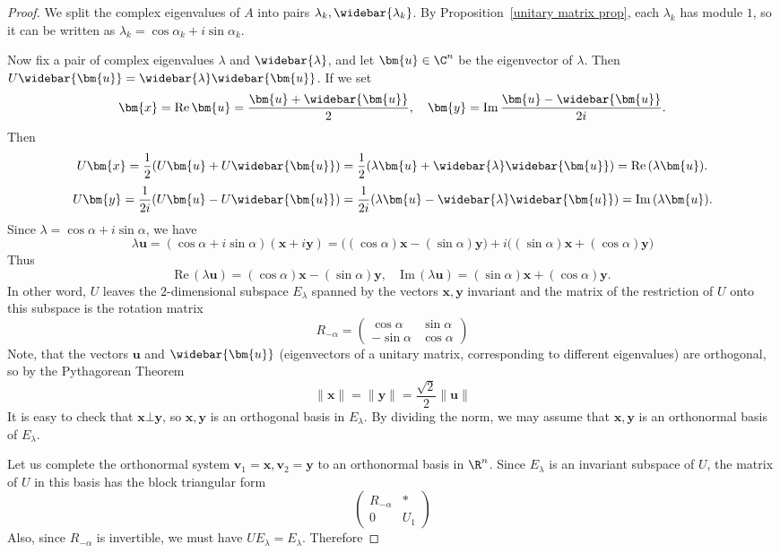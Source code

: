 \begin{proof}
We split the complex eigenvalues of $A$ into pairs $\lambda_k,\widebar{\lambda_k}$. By Proposition~\ref{unitary matrix prop}, each $\lambda_k$ has module $1$, so it can be written as $\lambda_k=\cos\alpha_k+i\sin\alpha_k$.\par
Now fix a pair of complex eigenvalues $\lambda$ and $\widebar{\lambda}$, and let $\bm{u}\in\C^n$ be the eigenvector of $\lambda$. Then $U\widebar{\bm{u}}=\widebar{\lambda}\widebar{\bm{u}}$. If we set 
\[\bm{x}=\mathrm{Re}\,\bm{u}=\frac{\bm{u}+\widebar{\bm{u}}}{2},\quad \bm{y}=\mathrm{Im}\,\frac{\bm{u}-\widebar{\bm{u}}}{2i}.\]
Then
\[U\bm{x}=\frac{1}{2}(U\bm{u}+U\widebar{\bm{u}})=\frac{1}{2}(\lambda\bm{u}+\widebar{\lambda}\widebar{\bm{u}})=\mathrm{Re}\,(\lambda\bm{u}).\]
\[U\bm{y}=\frac{1}{2i}(U\bm{u}-U\widebar{\bm{u}})=\frac{1}{2i}(\lambda\bm{u}-\widebar{\lambda}\widebar{\bm{u}})=\mathrm{Im}\,(\lambda\bm{u}).\]
Since $\lambda=\cos\alpha+i\sin\alpha$, we have
\[\lambda\bm{u}=(\cos\alpha+i\sin\alpha)(\bm{x}+i\bm{y})=\big((\cos\alpha)\bm{x}-(\sin\alpha)\bm{y}\big)+i\big((\sin\alpha)\bm{x}+(\cos\alpha)\bm{y}\big)\]
Thus
\[\mathrm{Re}\,(\lambda\bm{u})=(\cos\alpha)\bm{x}-(\sin\alpha)\bm{y},\quad\mathrm{Im}\,(\lambda\bm{u})=(\sin\alpha)\bm{x}+(\cos\alpha)\bm{y}.\]
In other word, $U$ leaves the $2$-dimensional subspace $E_\lambda$ spanned by the vectors $\bm{x},\bm{y}$ invariant and the matrix of the restriction of $U$ onto this subspace is the rotation matrix
\[R_{-\alpha}=\begin{pmatrix}
\cos\alpha&\sin\alpha\\
-\sin\alpha&\cos\alpha
\end{pmatrix}\]
Note, that the vectors $\bm{u}$ and $\widebar{\bm{u}}$ (eigenvectors of a unitary matrix, corresponding to different eigenvalues) are orthogonal, so by the Pythagorean Theorem
\[\|\bm{x}\|=\|\bm{y}\|=\frac{\sqrt{2}}{2}\|\bm{u}\|\]
It is easy to check that $\bm{x}\bot\bm{y}$, so $\bm{x},\bm{y}$ is an orthogonal basis in $E_\lambda$. By dividing the norm, we may assume that $\bm{x},\bm{y}$ is an orthonormal basis of $E_\lambda$.\par
Let us complete the orthonormal system $\bm{v}_1=\bm{x},\bm{v}_2=\bm{y}$ to an orthonormal basis in $\R^n$. Since $E_\lambda$ is an invariant subspace of $U$, the matrix of $U$ in this basis has the block triangular form
\[\begin{pmatrix}
R_{-\alpha}&*\\
0&U_1
\end{pmatrix}\]
Also, since $R_{-\alpha}$ is invertible, we must have $UE_\lambda=E_\lambda$. Therefore

\end{proof}
